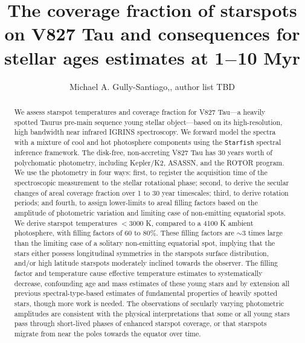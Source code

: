 \documentclass[revtex4]{emulateapj}%
\begin{document}
\title{The coverage fraction of starspots on V827 Tau and consequences for stellar ages estimates at 1$-$10 Myr}

\author{Michael A. Gully-Santiago,, author list TBD}



\begin{abstract}

We assess starspot temperatures and coverage fraction for V827 Tau---a heavily spotted Taurus pre-main sequence young stellar object---based on its high-resolution, high bandwidth near infrared IGRINS spectroscopy.  We forward model the spectra with a mixture of cool and hot photosphere components using the \texttt{Starfish} spectral inference framework.  The disk-free, non-accreting V827 Tau has 30 years worth of polychomatic photometry, including Kepler/K2, ASASSN, and the ROTOR program.  We use the photometry in four ways: first, to register the acquisition time of the spectroscopic measurement to the stellar rotational phase; second, to derive the secular changes of areal coverage fraction over 1 to 30 year timescales; third, to derive rotation periods; and fourth, to assign lower-limits to areal filling factors based on the amplitude of photometric variation and limiting case of non-emitting equatorial spots.  We derive starspot temperatures $<3000$ K, compared to a 4100 K ambient photosphere, with filling factors of $60$ to $80\%$.  These filling factors are $\sim3$ times large than the limiting case of a solitary non-emitting equatorial spot, implying that the stars either possess longitudinal symmetries in the starspots surface distribution, and/or high latitude starspots moderately inclined towards the observer.  The filling factor and temperature cause effective temperature estimates to systematically decrease, confounding age and mass estimates of these young stars and by extension all previous spectral-type-based estimates of fundamental properties of heavily spotted stars, though more work is needed.  The observations of secularly varying photometric amplitudes are consistent with the physical interpretations that some or all young stars pass through short-lived phases of enhanced starspot coverage, or that starspots migrate from near the poles towards the equator over time.

\end{abstract}

\end{document}
